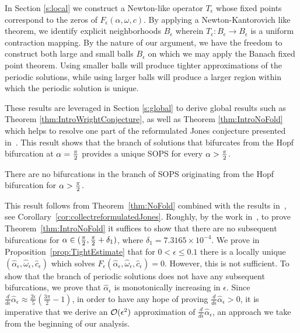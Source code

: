 In Section \ref{s:local} we construct a Newton-like operator $T_\epsilon$ whose fixed points correspond to the zeros of $F_\epsilon(\alpha, \omega, c)$.  
By applying a Newton-Kantorovich like theorem, we identify explicit neighborhoods $B_\epsilon$ wherein $T_\epsilon: B_\epsilon \to B_\epsilon$ is a uniform contraction mapping. 
By the nature of our argument, we have the freedom to construct both large and small balls $ B_\epsilon$ on which we may apply the Banach fixed point theorem. Using smaller balls will produce tighter  approximations of the periodic solutions, while using larger balls will produce a larger region within which the periodic solution is unique. 


These results are leveraged in  Section \ref{s:global} to derive global results such  as Theorem \ref{thm:IntroWrightConjecture}, as well as Theorem \ref{thm:IntroNoFold} which helps to resolve one part of the reformulated Jones conjecture presented in~\cite{lessard2010recent}. 
This result shows that the branch of solutions that bifurcates from the Hopf bifurcation at $\alpha = \tfrac{\pi}{2}$ provides a unique SOPS for every $\alpha > \tfrac{\pi}{2}$. 
\begin{theorem}
\label{thm:IntroNoFold}
There are no bifurcations in the branch of SOPS originating from the Hopf bifurcation for $\alpha > \tfrac{\pi}{2}  $. 
\end{theorem}

This result follows from Theorem~\ref{thm:NoFold} combined with the results in~\cite{lessard2010recent,jlm2016Floquet,xie1991thesis}, see Corollary~\ref{cor:collectreformulatedJones}. 
Roughly, by the work in~\cite{lessard2010recent,jlm2016Floquet,xie1991thesis},
to prove Theorem~\ref{thm:IntroNoFold} 
it suffices to show that there are no subsequent bifurcations for $ \alpha \in ( \tfrac{\pi}{2} , \tfrac{\pi}{2} + \delta_1)$, where $\delta_1 = 7.3165 \times 10^{-4}$. 
We prove in Proposition~\ref{prop:TightEstimate} that for  $ 0 < \epsilon \leq 0.1$  
 there is a locally unique $( \hat{\alpha}_\epsilon , \hat{\omega}_\epsilon, \hat{c}_\epsilon)$ which solves $F_\epsilon ( \hat{\alpha}_\epsilon , \hat{\omega}_\epsilon, \hat{c}_\epsilon)=0$. 
However, this is not sufficient. 
To show that the branch of periodic solutions does not have any subsequent bifurcations, we prove that $\hat{\alpha}_\epsilon $ is monotonically increasing in $ \epsilon$. 
Since  
$\frac{d}{d\epsilon} \hat{\alpha}_\epsilon \approx \tfrac{2 \epsilon}{5} ( \tfrac{3 \pi}{2} -1 ) $, 
in order to have any hope of proving $\frac{d}{d\epsilon} \hat{\alpha}_\epsilon >0$, it is imperative that we derive an $\mathcal{O}(\epsilon^2)$ approximation of $ \frac{d}{d\epsilon} \hat{\alpha}_\epsilon$, an approach we take from the beginning of our analysis. 


